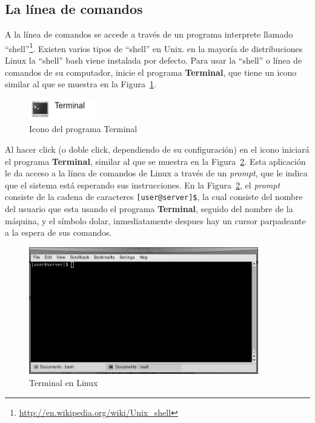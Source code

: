 \documentclass[letter,11pt]{book}
\begin{document}
\subsection{La línea de comandos}

A la línea de comandos se accede a través de un programa interprete llamado ``shell''\footnote{\url{http://en.wikipedia.org/wiki/Unix_shell}}.  Existen varios tipos de ``shell'' en Unix. en la mayoría de distribuciones Linux la ``shell'' bash viene instalada por defecto. Para usar la ``shell'' o línea de comandos de su computador, inicie el programa \textbf{Terminal}, que tiene un icono similar al que se muestra en la Figura~\ref{terminalico}.

\begin{figure}[ht]
\centering
   \includegraphics[width=3cm]{Figs/terminalico.png}
  \caption{\label{terminalico}Icono del programa Terminal}
\end{figure}

Al hacer click (o doble click, dependiendo de su configuración) en el icono iniciará el programa \textbf{Terminal}, similar al que se muestra en la Figura~\ref{terminal}. Esta aplicación le da acceso a la línea de comandos de Linux a través de un \textit{prompt}, que le indica que el sistema está esperando sus instrucciones. En la Figura~\ref{terminal}, el \textit{prompt} consiste de la cadena de  caracteres \Verb+[user@server]$+, la cual consiste del nombre del usuario que esta usando el programa \textbf{Terminal}, seguido del nombre de la máquina, y el símbolo dolar, inmediatamente despues hay un cursor parpadeante a la espera de sus comandos. 

\begin{figure}[ht]
\centering
   \includegraphics[width=10cm]{Figs/terminal.png}
  \caption{\label{terminal}Terminal en Linux}
\end{figure}
\end{document}
